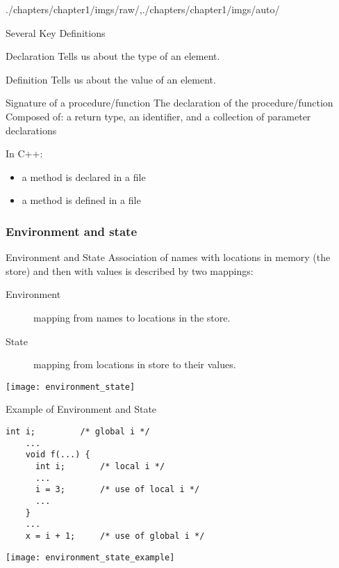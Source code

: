 \begin{graphicspathcontext}{{./chapters/chapter1/imgs/raw/},{./chapters/chapter1/imgs/auto/}}
\begin{bibunit}[apalike]
\begin{frame}{Several Key Definitions \insertcontinuationtext}
	\begin{definitionblock}{Declaration}
		Tells us about the type of an element. 
	\end{definitionblock}
	\begin{definitionblock}{Definition}
		Tells us about the value of an element. 
	\end{definitionblock}
	\begin{definitionblock}{Signature of a procedure/function}
		The declaration of the procedure/function \\
		Composed of: a return type, an identifier, and a collection of parameter declarations
	\end{definitionblock}
	\begin{example}\smaller In C++: \begin{itemize}
		\item a method is declared in a  file
		\item a method is defined in a  file
		\end{itemize}
	\end{example}
\end{frame}

\subsubsection{Environment and state}

\begin{frame}{Environment and State}
	Association of names with locations in memory (the store) and then with values is described by two mappings:
	\begin{description}
	\item[Environment] mapping from names to locations in the store.
	\item[State] mapping from locations in store to their values.
	\end{description}
	\vfill
	\begin{center}
	\texttt{[image: environment\_state]}
	\end{center}
\end{frame}

\begin{frame}[fragile]{Example of Environment and State}
	\begin{lstlisting}[style=lststyle-c]
	int i;         /* global i */
	...
	void f(...) {
	  int i;       /* local i */
	  ...
	  i = 3;       /* use of local i */
	  ...
	}
	...
	x = i + 1;     /* use of global i */
	\end{lstlisting}
	\vfill
	\begin{center}
	\texttt{[image: environment\_state\_example]}
	\end{center}
\end{frame}


\end{bibunit}
\end{graphicspathcontext}

